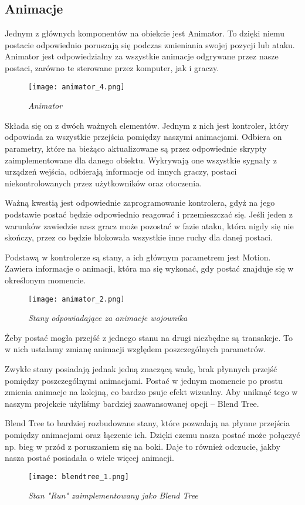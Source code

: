 \subsection{Animacje}
Jednym z głównych komponentów na obiekcie jest Animator.
To dzięki niemu postacie odpowiednio poruszają się podczas zmieniania swojej pozycji lub ataku.
Animator jest odpowiedzialny za wszystkie animacje odgrywane przez nasze postaci, zarówno te sterowane przez komputer, jak i graczy.

    \begin{figure}[H]
    \center
    \texttt{[image: animator\_4.png]}
    \caption{ \textit{Animator}}
    \end{figure}

Składa się on z dwóch ważnych elementów. Jednym z nich jest kontroler, który odpowiada za wszystkie przejścia pomiędzy naszymi animacjami. Odbiera on parametry, które na bieżąco aktualizowane są przez odpowiednie skrypty zaimplementowane dla danego obiektu. Wykrywają one wszystkie sygnały z urządzeń wejścia, odbierają informacje od innych graczy, postaci niekontrolowanych przez użytkowników oraz otoczenia.

Ważną kwestią jest odpowiednie zaprogramowanie kontrolera, gdyż na jego podstawie postać będzie odpowiednio reagować i przemieszczać się. Jeśli jeden z warunków zawiedzie nasz gracz może pozostać w fazie ataku, która nigdy się nie skończy, przez co będzie blokowała wszystkie inne ruchy dla danej postaci.

Podstawą w kontrolerze są stany, a ich głównym parametrem jest Motion. Zawiera informacje o animacji, która ma się wykonać, gdy postać znajduje się w określonym momencie.

\begin{figure}[H]
    \center
    \texttt{[image: animator\_2.png]}
    \caption{ \textit{Stany odpowiadające za animacje wojownika}}
    \end{figure}

Żeby postać mogła przejść z jednego stanu na drugi niezbędne są transakcje. To w nich ustalamy zmianę animacji względem poszczególnych parametrów. 

Zwykłe stany posiadają jednak jedną znaczącą wadę, brak płynnych przejść pomiędzy poszczególnymi animacjami. Postać w jednym momencie po prostu zmienia animacje na kolejną, co bardzo psuje efekt wizualny. Aby uniknąć tego w naszym projekcie użyliśmy bardziej zaawansowanej opcji – Blend Tree.

Blend Tree to bardziej rozbudowane stany, które pozwalają na płynne przejścia pomiędzy animacjami oraz łączenie ich. Dzięki czemu nasza postać może połączyć np. bieg w przód z poruszaniem się na boki. Daje to również odczucie, jakby nasza postać posiadała o wiele więcej animacji.
\begin{figure}[H]
    \center
    \texttt{[image: blendtree\_1.png]}
    \caption{ \textit{Stan "Run"  zaimplementowany jako Blend Tree}}
    \end{figure}



